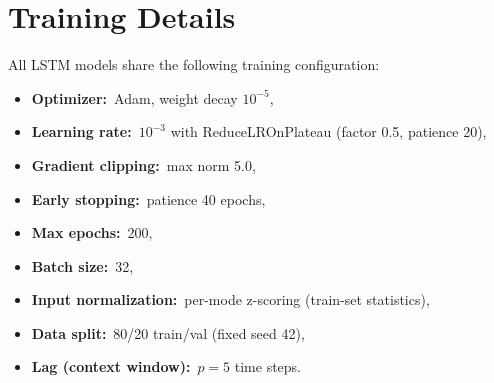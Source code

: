 \documentclass[11pt,letterpaper]{article}
\begin{document}
\section{Training Details}
\label{app:training}

All LSTM models share the following training configuration:
\begin{itemize}[nosep]
  \item \textbf{Optimizer:}\ Adam, weight decay $10^{-5}$,
  \item \textbf{Learning rate:}\ $10^{-3}$ with ReduceLROnPlateau (factor 0.5, patience 20),
  \item \textbf{Gradient clipping:}\ max norm 5.0,
  \item \textbf{Early stopping:}\ patience 40 epochs,
  \item \textbf{Max epochs:}\ 200,
  \item \textbf{Batch size:}\ 32,
  \item \textbf{Input normalization:}\ per-mode z-scoring (train-set statistics),
  \item \textbf{Data split:}\ 80/20 train/val (fixed seed 42),
  \item \textbf{Lag (context window):}\ $p=5$ time steps.
\end{itemize}
\end{document}
